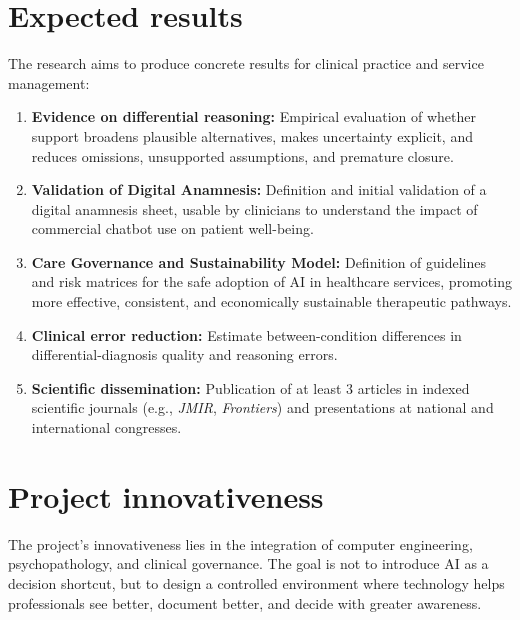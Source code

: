 \documentclass[11pt,a4paper]{article}
\begin{document}
\newpage

\section{Expected results}

The research aims to produce concrete results for clinical practice and service management:
\begin{enumerate}
    \item \textbf{Evidence on differential reasoning:} Empirical evaluation of whether support broadens plausible alternatives, makes uncertainty explicit, and reduces omissions, unsupported assumptions, and premature closure.
    \item \textbf{Validation of Digital Anamnesis:} Definition and initial validation of a digital anamnesis sheet, usable by clinicians to understand the impact of commercial chatbot use on patient well-being.
    \item \textbf{Care Governance and Sustainability Model:} Definition of guidelines and risk matrices for the safe adoption of AI in healthcare services, promoting more effective, consistent, and economically sustainable therapeutic pathways.
    \item \textbf{Clinical error reduction:} Estimate between-condition differences in differential-diagnosis quality and reasoning errors.
    \item \textbf{Scientific dissemination:} Publication of at least 3 articles in indexed scientific journals (e.g., \textit{JMIR}, \textit{Frontiers}) and presentations at national and international congresses.
\end{enumerate}

\section{Project innovativeness}

The project's innovativeness lies in the integration of computer engineering, psychopathology, and clinical governance. The goal is not to introduce AI as a decision shortcut, but to design a controlled environment where technology helps professionals see better, document better, and decide with greater awareness.
\end{document}
